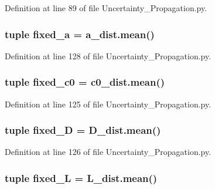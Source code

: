 Definition at line 89 of file Uncertainty\-\_\-\-Propagation.\-py.

\hypertarget{namespace_uncertainty___propagation_ade6c2eeacf12db0e1ea6a9a5c8379591}{
\subsubsection[{fixed\-\_\-a}]{\setlength{\rightskip}{0pt plus 5cm}tuple fixed\-\_\-a = a\-\_\-dist.\-mean()}}\label{namespace_uncertainty___propagation_ade6c2eeacf12db0e1ea6a9a5c8379591}


Definition at line 128 of file Uncertainty\-\_\-\-Propagation.\-py.

\hypertarget{namespace_uncertainty___propagation_a66aeb0f33c59c12b7b9eb6ea98f6dbee}{
\subsubsection[{fixed\-\_\-c0}]{\setlength{\rightskip}{0pt plus 5cm}tuple fixed\-\_\-c0 = c0\-\_\-dist.\-mean()}}\label{namespace_uncertainty___propagation_a66aeb0f33c59c12b7b9eb6ea98f6dbee}


Definition at line 125 of file Uncertainty\-\_\-\-Propagation.\-py.

\hypertarget{namespace_uncertainty___propagation_ac8e1acccb8fb7e4ce7cfa77a304e936a}{
\subsubsection[{fixed\-\_\-\-D}]{\setlength{\rightskip}{0pt plus 5cm}tuple fixed\-\_\-\-D = D\-\_\-dist.\-mean()}}\label{namespace_uncertainty___propagation_ac8e1acccb8fb7e4ce7cfa77a304e936a}


Definition at line 126 of file Uncertainty\-\_\-\-Propagation.\-py.

\hypertarget{namespace_uncertainty___propagation_adf3a46710b42fda247caf73278ffca4d}{
\subsubsection[{fixed\-\_\-\-L}]{\setlength{\rightskip}{0pt plus 5cm}tuple fixed\-\_\-\-L = L\-\_\-dist.\-mean()}}\label{namespace_uncertainty___propagation_adf3a46710b42fda247caf73278ffca4d}


